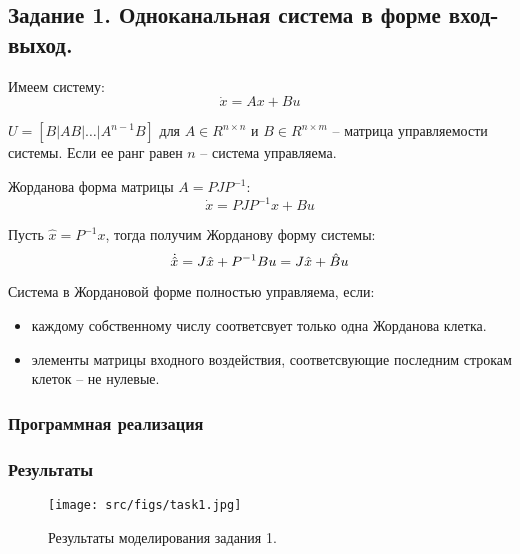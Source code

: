 \subsection{Задание 1. Одноканальная система в форме вход-выход.}
Имеем систему:
\[\dot{x} = A x + Bu \]

\(U = [B | AB | \hdots | A^{n-1}B]\) для \(A \in R^{n \times n}\) и \(B \in R^{n \times m}\) -- матрица управляемости системы. Если ее ранг равен \(n\) -- система управляема.

Жорданова форма матрицы \(A = P J P^{-1}\):
\[
        \dot{x} = P J P^{-1} x + Bu 
\]

Пусть \(\hat{x} = P^{-1}x\), тогда получим Жорданову форму системы:
\[
        \dot{\hat{x}} = J\hat{x} + P^{-1}Bu = J\hat{x} + \hat{B}u  \\
\]

Система в Жордановой форме полностью управляема, если:
\begin{itemize}
    \item каждому собственному числу соответсвует только одна Жорданова клетка. 
    \item элементы матрицы входного воздействия, соответсвующие последним строкам клеток -- не нулевые.
\end{itemize}
\subsubsection{Программная реализация}
\subsubsection{Результаты}
\begin{figure}[ht!]
        \centering
        \texttt{[image: src/figs/task1.jpg]}
        \caption{Результаты моделирования задания 1.}
        \label{fig:task1}
\end{figure}


